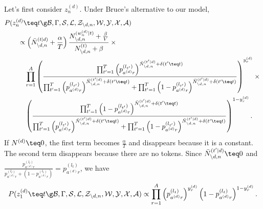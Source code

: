 \documentclass[10pt,english,oneside]{article}
\begin{document}
Let's first consider $z_n^{(d)}$. Under Bruce's alternative to our
model,
\begin{align}
  &P(z_n^{(d)} \teq t \g \mathcal{B}, \Gamma, \mathcal{S}, \mathcal{L},
  \mathcal{Z}_{\setminus d, n}, \mathcal{W}, \mathcal{Y}, \mathcal{X},
  \mathcal{A}) \notag \\
&\qquad \propto \left( \bar{N}^{(t|d)}_{\setminus d, n} +
      \frac{\alpha}{T}\right) \frac{N^{(w_n^{(d)}|t)}_{\setminus
                  d, n} + \frac{\beta}{V}}{N^{(t)}_{\setminus d, n} +
        \beta}
          \times {} \notag \\
&\qquad\quad \prod_{r=1}^A \left( \frac{
                \prod_{t'=1}^T \left(
                p^{(l_{t'})}_{a^{(d)}r}\right)^{\bar{N}^{(t'|d)}_{\setminus
                    d,n} + \delta(t' \teq t)}
              }{
                \prod_{t'=1}^T \left(
                p^{(l_{t'})}_{a^{(d)}r}\right)^{\bar{N}^{(t'|d)}_{\setminus
                    d,n} + \delta(t' \teq t)} +
                \prod_{t'=1}^T \left(1 - 
                p^{(l_{t'})}_{a^{(d)}r}\right)^{\bar{N}^{(t'|d)}_{\setminus
                    d,n} + \delta(t' \teq t)}                
              }\right)^{y^{(d)}_r} \times {} \notag \\
&\qquad \quad \left( \frac{
                \prod_{t'=1}^T \left(1 - 
                p^{(l_{t'})}_{a^{(d)}r}\right)^{\bar{N}^{(t'|d)}_{\setminus
                    d,n} + \delta(t' \teq t)}
              }{
                \prod_{t'=1}^T \left(
                p^{(l_{t'})}_{a^{(d)}r}\right)^{\bar{N}^{(t'|d)}_{\setminus
                    d,n} + \delta(t' \teq t)} +
                \prod_{t'=1}^T \left(1 - 
                p^{(l_{t'})}_{a^{(d)}r}\right)^{\bar{N}^{(t'|d)}_{\setminus
                    d,n} + \delta(t' \teq t)}                
              }\right)^{1 - y^{(d)}_r}.
\end{align}
If $N^{(d)} \teq 0$, the first term becomes $\frac{\alpha}{T}$ and
disappears because it is a constant. The second term disappears
because there are no tokens. Since $\bar{N}^{(t'|d)}_{\setminus d, n}
\teq 0$ and
$\frac{p^{(l_t)}_{a^{(d)}r}}{p^{(l_t)}_{a^{(d)}r} + \left(1 -
  p^{(l_t)}_{a^{(d)}r}\right)} = p^{(l_t)}_{a^{(d)}r}$,
we have
\begin{equation}
 P(z_1^{(d)} \teq t \g \mathcal{B}, \Gamma, \mathcal{S}, \mathcal{L},
  \mathcal{Z}_{\setminus d, n}, \mathcal{W}, \mathcal{Y}, \mathcal{X},
  \mathcal{A}) \propto \prod_{r=1}^A \left(
  p^{(l_t)}_{a^{(d)}r}
    \right)^{y^{(d)}_r}
  \left( 1 - p^{(l_t)}_{a^{(d)}r}\right)^{1 - y^{(d)}_r}.
\end{equation}
\end{document}
